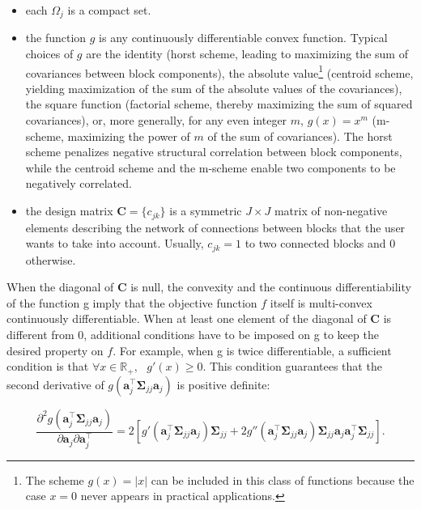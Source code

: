 \documentclass[
]{jss}
\begin{document}
\begin{itemize}
\item each $\Omega_j$ is a compact set.

\item the function $g$ is any continuously differentiable convex function. 
Typical choices of $g$ are the identity (horst scheme, leading to maximizing 
the sum of covariances between block components), the absolute 
value\footnote{The scheme $g(x) = \vert x \vert$ can be included in this class 
of functions because the case $x=0$ never appears in practical applications.} 
(centroid scheme, yielding maximization of the sum of the absolute values of 
the covariances), the square function (factorial scheme, thereby maximizing the 
sum of squared covariances), or, more generally, for any even integer $m$, 
$g(x) = x^m$ (m-scheme, maximizing the power of $m$ of the sum of covariances). 
The horst scheme penalizes negative structural correlation between block 
components, while the centroid scheme and the m-scheme enable two 
components to be negatively correlated. 

\item the design matrix $\mathbf C = \lbrace c_{jk}\rbrace$ is a symmetric 
$J \times J$ matrix of non-negative elements describing the network of 
connections between blocks that the user wants to take into account. 
Usually, $c_{jk} = 1$ to two connected blocks and $0$ otherwise. 
\end{itemize}

When the diagonal of \(\mathbf{C}\) is null, the convexity and the
continuous differentiability of the function g imply that the objective
function \(f\) itself is multi-convex continuously differentiable. When
at least one element of the diagonal of \(\mathbf{C}\) is different from
\(0\), additional conditions have to be imposed on g to keep the desired
property on \(f\). For example, when g is twice differentiable, a
sufficient condition is that
\(\forall x\in\mathbb{R}_+, \text{ } g'(x)\geq 0\). This condition
guarantees that the second derivative of
\(g\left(\mathbf{a}_j^\top \mathbf{\Sigma}_{jj} \mathbf{a}_j\right)\) is
positive definite:

\begin{equation}
\frac{\partial^2 g\left(\mathbf a_j^\top  \mathbf \Sigma_{jj} \mathbf a_j \right)}{\partial \mathbf a_j \partial \mathbf a_j^\top} = 2 \left[ g'\left( \mathbf a_j^\top  \mathbf \Sigma_{jj} \mathbf a_j \right) \mathbf \Sigma_{jj} + 2 g''\left(\mathbf a_j^\top  \mathbf \Sigma_{jj} \mathbf a_j\right)  \mathbf \Sigma_{jj}\mathbf a_j\mathbf a_j^\top \mathbf \Sigma_{jj} \right]. 
\end{equation}
\end{document}
